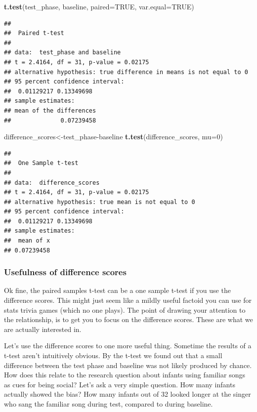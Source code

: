 \documentclass[]{book}
\newenvironment{Shaded}{\begin{snugshade}}{\end{snugshade}}
\newcommand{\KeywordTok}[1]{\textcolor[rgb]{0.13,0.29,0.53}{\textbf{{#1}}}}
\newcommand{\DataTypeTok}[1]{\textcolor[rgb]{0.13,0.29,0.53}{{#1}}}
\newcommand{\DecValTok}[1]{\textcolor[rgb]{0.00,0.00,0.81}{{#1}}}
\newcommand{\OtherTok}[1]{\textcolor[rgb]{0.56,0.35,0.01}{{#1}}}
\newcommand{\NormalTok}[1]{{#1}}
\theoremstyle{definition}
\theoremstyle{definition}
\theoremstyle{definition}
\theoremstyle{remark}
\begin{document}
\begin{Shaded}
\begin{Highlighting}[]
\KeywordTok{t.test}\NormalTok{(test_phase, baseline, }\DataTypeTok{paired=}\OtherTok{TRUE}\NormalTok{, }\DataTypeTok{var.equal=}\OtherTok{TRUE}\NormalTok{)}
\end{Highlighting}
\end{Shaded}

\begin{verbatim}
## 
##  Paired t-test
## 
## data:  test_phase and baseline
## t = 2.4164, df = 31, p-value = 0.02175
## alternative hypothesis: true difference in means is not equal to 0
## 95 percent confidence interval:
##  0.01129217 0.13349698
## sample estimates:
## mean of the differences 
##              0.07239458
\end{verbatim}

\begin{Shaded}
\begin{Highlighting}[]
\NormalTok{difference_scores<-test_phase-baseline}
\KeywordTok{t.test}\NormalTok{(difference_scores, }\DataTypeTok{mu=}\DecValTok{0}\NormalTok{)}
\end{Highlighting}
\end{Shaded}

\begin{verbatim}
## 
##  One Sample t-test
## 
## data:  difference_scores
## t = 2.4164, df = 31, p-value = 0.02175
## alternative hypothesis: true mean is not equal to 0
## 95 percent confidence interval:
##  0.01129217 0.13349698
## sample estimates:
##  mean of x 
## 0.07239458
\end{verbatim}

\subsubsection{Usefulness of difference
scores}\label{usefulness-of-difference-scores}

Ok fine, the paired samples t-test can be a one sample t-test if you use
the difference scores. This might just seem like a mildly useful factoid
you can use for stats trivia games (which no one plays). The point of
drawing your attention to the relationship, is to get you to focus on
the difference scores. These are what we are actually interested in.

Let's use the difference scores to one more useful thing. Sometime the
results of a t-test aren't intuitively obvious. By the t-test we found
out that a small difference between the test phase and baseline was not
likely produced by chance. How does this relate to the research question
about infants using familiar songs as cues for being social? Let's ask a
very simple question. How many infants actually showed the bias? How
many infants out of 32 looked longer at the singer who sang the familiar
song during test, compared to during baseline.
\end{document}
